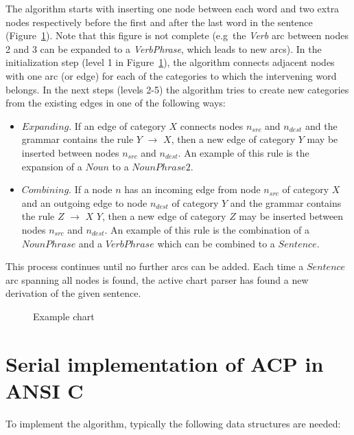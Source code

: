 The algorithm starts with inserting one node between each word and two extra
nodes respectively before the first and after the last word in the
sentence (Figure~\ref{example}). Note that this figure is not
complete (e.g\ the {\em Verb} arc between nodes 2 and 3 can be
expanded to a {\em VerbPhrase}, which leads to new arcs). In the initialization step
(level 1 in Figure~\ref{example}), the algorithm connects adjacent nodes with one
arc (or edge) for each of the categories to which the intervening word
belongs. In the next steps (levels 2-5) the algorithm tries to create
new categories from the existing edges in one of the following ways:
\begin{itemize}

\item  $Expanding$.
	If an edge of category $X$ connects nodes $n_{src}$ and $n_{dest}$ and
	the grammar contains the rule $Y$ {$\rightarrow$} $X$, then
	a new edge of category $Y$ may be inserted between nodes $n_{src}$
	and $n_{dest}$. An example of this rule is the expansion of a
	$Noun$ to a $NounPhrase2$.

\item	$Combining$.
	If a node $n$ has an incoming edge from node $n_{src}$ of
	category $X$ and an outgoing edge to node $n_{dest}$ of category
	$Y$ and the grammar contains the rule $Z$ {$ \rightarrow $} $X$
	$Y$, then a new edge of category $Z$ may be inserted between
	nodes $n_{src}$ and $n_{dest}$. An example of this rule is the
	combination of a $NounPhrase$ and a $VerbPhrase$ which can be
	combined to a $Sentence$.
\end{itemize}

This process continues until no further arcs can be added. Each time a
$Sentence$ arc spanning all nodes is found, the active chart
parser has found a new derivation of the given sentence.

\begin{figure}[tbh]
\centerline{
}
\caption{Example chart}
\label{example}
\end{figure}

\section{Serial implementation of ACP in ANSI C}

To implement the algorithm, typically the following data structures
are needed:

